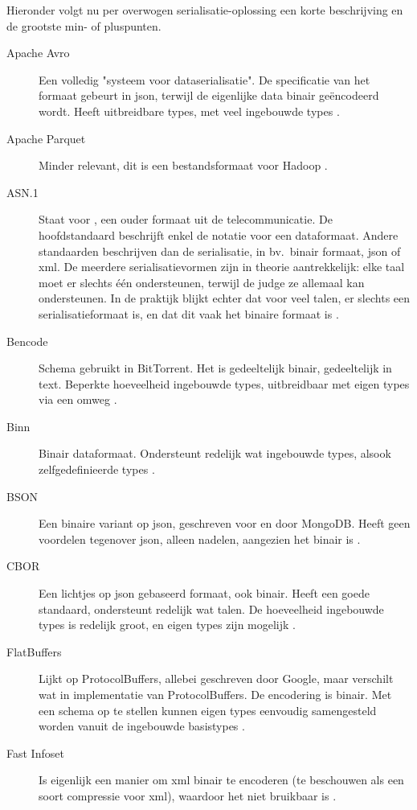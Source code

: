 Hieronder volgt nu per overwogen serialisatie-oplossing een korte beschrijving en de grootste min- of pluspunten.

\begin{description}
    \item[Apache Avro] Een volledig "systeem voor dataserialisatie".
    De specificatie van het formaat gebeurt in json, terwijl de eigenlijke data binair geëncodeerd wordt.
    Heeft uitbreidbare types, met veel ingebouwde types \autocite{avro}.
    \item[Apache Parquet] Minder relevant, dit is een bestandsformaat voor Hadoop \autocite{parquet}.
    \item[ASN.1] Staat voor , een ouder formaat uit de telecommunicatie.
    De hoofdstandaard beschrijft enkel de notatie voor een dataformaat.
    Andere standaarden beschrijven dan de serialisatie, in bv.\ binair formaat, json of xml.
    De meerdere serialisatievormen zijn in theorie aantrekkelijk: elke taal moet er slechts één ondersteunen, terwijl de judge ze allemaal kan ondersteunen.
    In de praktijk blijkt echter dat voor veel talen, er slechts een serialisatieformaat is, en dat dit vaak het binaire formaat is \autocite{x680}.
    \item[Bencode] Schema gebruikt in BitTorrent.
    Het is gedeeltelijk binair, gedeeltelijk in text.
    Beperkte hoeveelheid ingebouwde types, uitbreidbaar met eigen types via een omweg \autocite{cohen2017}.
    \item[Binn] Binair dataformaat.
    Ondersteunt redelijk wat ingebouwde types, alsook zelfgedefinieerde types \autocite{ramos2019}.
    \item[BSON] Een binaire variant op json, geschreven voor en door MongoDB.
    Heeft geen voordelen tegenover json, alleen nadelen, aangezien het binair is \autocite{bson}.
    \item[CBOR] Een lichtjes op json gebaseerd formaat, ook binair.
    Heeft een goede standaard, ondersteunt redelijk wat talen.
    De hoeveelheid ingebouwde types is redelijk groot, en eigen types zijn mogelijk \autocite{rfc7049}.
    \item[FlatBuffers] Lijkt op ProtocolBuffers, allebei geschreven door Google, maar verschilt wat in implementatie van ProtocolBuffers.
    De encodering is binair.
    Met een schema op te stellen kunnen eigen types eenvoudig samengesteld worden vanuit de ingebouwde basistypes \autocite{flatbuffers}.
    \item[Fast Infoset] Is eigenlijk een manier om xml binair te encoderen (te beschouwen als een soort compressie voor xml), waardoor het niet bruikbaar is \autocite{x981}.

\end{description}
